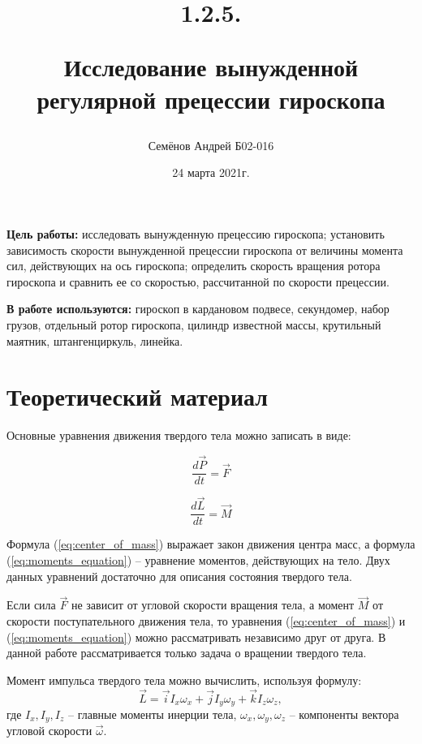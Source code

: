 \documentclass[12pt,a4paper]{article}
\title{
1.2.5.

Исследование вынужденной регулярной прецессии гироскопа
}
\author{Семёнов Андрей Б02-016}
\begin{document}
\date{24 марта 2021г.}
\maketitle

\newpage

	\textbf{Цель работы:} исследовать вынужденную прецессию гироскопа; установить зависимость скорости вынужденной прецессии гироскопа от величины момента сил, действующих на ось гироскопа; определить скорость вращения ротора гироскопа и сравнить ее со скоростью, рассчитанной по скорости прецессии.
	
	\textbf{В работе используются:} гироскоп в кардановом подвесе, секундомер, набор грузов, отдельный ротор гироскопа, цилиндр известной массы, крутильный маятник, штангенциркуль, линейка. 


\section{Теоретический материал}

Основные уравнения движения твердого тела можно записать в виде:

\begin{equation}
	\frac{d\vec{P}}{dt} = \vec{F}
	\label{eq:center_of_mass}
\end{equation}

\begin{equation}
	\frac{d\vec{L}}{dt} = \vec{M}
	\label{eq:moments_equation}
\end{equation}

Формула (\ref{eq:center_of_mass}) выражает закон движения центра масс, а формула (\ref{eq:moments_equation}) -- уравнение моментов, действующих на тело. Двух данных уравнений достаточно для описания состояния твердого тела.

Если сила $\vec{F}$ не зависит от угловой скорости вращения тела, а момент $\vec{M}$ от скорости поступательного движения тела, то уравнения (\ref{eq:center_of_mass}) и (\ref{eq:moments_equation}) можно рассматривать независимо друг от друга. В данной работе рассматривается только задача о вращении твердого тела.

Момент импульса твердого тела можно вычислить, используя формулу:
\begin{equation}
	\vec{L} = \vec{i}I_{x}\omega_{x} + \vec{j}I_{y}\omega_{y} + \vec{k}I_{z}\omega_{z},
\end{equation}
где $ I_{x},I_{y},I_{z} $ -- главные моменты инерции тела, $ \omega_{x}, \omega_{y}, \omega_{z} $ -- компоненты вектора угловой скорости  $\vec{\omega} $.
\end{document}
